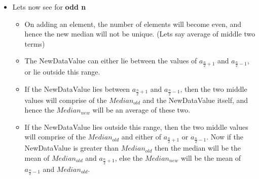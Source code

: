 \documentclass[12pt]{article}
\begin{document}
\begin{enumerate}
\begin{itemize}
\item Lets now see for \textbf{odd n}
	\begin{itemize}
	\item On adding an element, the number of elements will become even, and hence the new median will not be unique. (Lets say average of middle two terms)
	\item The NewDataValue can either lie between the values of $a_{\frac{n}{2}+1}$ and $a_{\frac{n}{2}-1}$, or lie outside this range.
	\item If the NewDataValue lies between $a_{\frac{n}{2}+1}$ and $a_{\frac{n}{2}-1}$, then the two middle values will comprise of the $Median_{old}$ and the NewDataValue itself, and hence the $Median_{new}$ will be an average of these two.
	\item If the NewDataValue lies outside this range, then the two middle values will comprise of the $Median_{old}$ and either of $a_{\frac{n}{2}+1}$ or $a_{\frac{n}{2}-1}$. Now if the NewDataValue is greater than $Median_{old}$ then the median will be the mean of $Median_{old}$ and $a_{\frac{n}{2}+1}$, else the $Median_{new}$ will be the mean of $a_{\frac{n}{2}-1}$ and $Median_{old}$.
	\end{itemize}
\end{itemize}


\end{enumerate}
\end{document}

